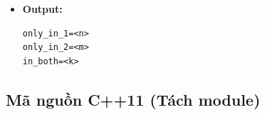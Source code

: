 \begin{itemize}
\begin{itemize}
        \begin{itemize}
            \item Ghi file:
\begin{lstlisting}
comparison.csv
\end{lstlisting}

            \item Format:
\begin{lstlisting}
word,count_file1,count_file2
\end{lstlisting}

            \item In summary:
\begin{lstlisting}
only_in_1=<n>
only_in_2=<m>
in_both=<k>
\end{lstlisting}
        \end{itemize}

    \end{itemize}

    \item \textbf{Output:}

\begin{lstlisting}
only_in_1=<n>
only_in_2=<m>
in_both=<k>
\end{lstlisting}

\end{itemize}

\subsection{Mã nguồn C++11 (Tách module)}


